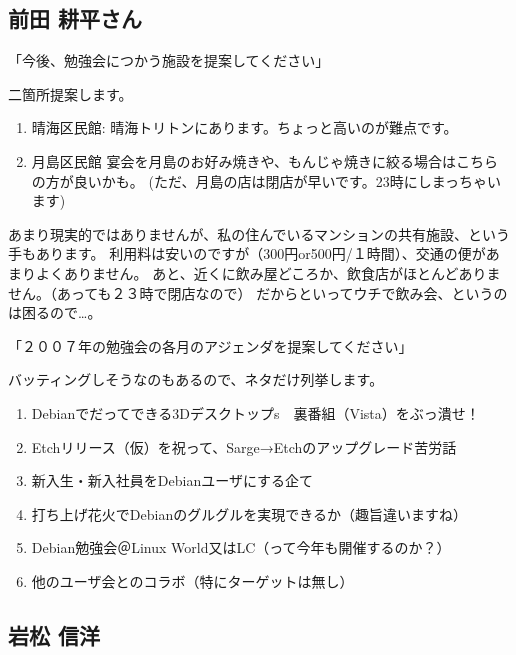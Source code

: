 \documentclass[cjk,dvipdfmx]{beamer}
\begin{document}
\subsection{前田 耕平さん}

\begin{frame}{「今後、勉強会につかう施設を提案してください」}

二箇所提案します。

\begin{enumerate}
 \item  晴海区民館:
 晴海トリトンにあります。ちょっと高いのが難点です。

 \item 月島区民館
 宴会を月島のお好み焼きや、もんじゃ焼きに絞る場合はこちらの方が良いかも。
	(ただ、月島の店は閉店が早いです。23時にしまっちゃいます)
\end{enumerate}

あまり現実的ではありませんが、私の住んでいるマンションの共有施設、という手もあります。
利用料は安いのですが（300円or500円/１時間）、交通の便があまりよくありません。
あと、近くに飲み屋どころか、飲食店がほとんどありません。（あっても２３時で閉店なので）
だからといってウチで飲み会、というのは困るので…。

\end{frame}

\begin{frame}{「２００７年の勉強会の各月のアジェンダを提案してください」}

バッティングしそうなのもあるので、ネタだけ列挙します。

{\small
\begin{enumerate}
 \item Debianでだってできる3Dデスクトップs　裏番組（Vista）をぶっ潰せ！
 \item Etchリリース（仮）を祝って、Sarge→Etchのアップグレード苦労話
 \item 新入生・新入社員をDebianユーザにする企て
 \item 打ち上げ花火でDebianのグルグルを実現できるか（趣旨違いますね）
 \item Debian勉強会＠Linux World又はLC（って今年も開催するのか？）
 \item 他のユーザ会とのコラボ（特にターゲットは無し）
\end{enumerate}
}

\end{frame}

\subsection{岩松 信洋}
\end{document}
